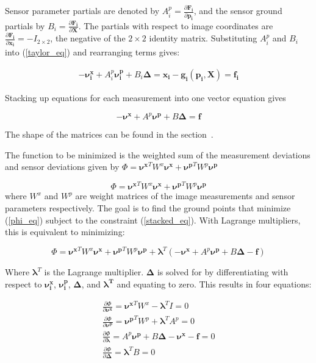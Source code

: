\documentclass[]{article}
\newcommand{\imgmeas}{\pmb{x_{i}}}
\newcommand{\grnd}{\pmb{X}}
\newcommand{\sensmeas}{\pmb{p_i}}
\newcommand{\imgnu}{\pmb{\nu_{i}^x}}
\newcommand{\sensnu}{\pmb{\nu_i^p}}
\newcommand{\grndupdate}{\pmb{\Delta}}
\newcommand{\Fimgpartials}{\frac{\partial{\pmb{F_{i}}}}{\partial{\imgmeas}}}
\newcommand{\Fgrndpartials}{\frac{\partial{\pmb{F_{i}}}}{\partial{\grnd}}}
\newcommand{\Fsenspartials}{\frac{\partial{\pmb{F_{i}}}}{\partial{\sensmeas}}}
\begin{document}
Sensor parameter partials are denoted by $A_{i}^p = \Fsenspartials$, and the sensor ground partials by $B_{i} = \Fgrndpartials$.  The partials with respect to image coordinates are ${\Fimgpartials=-I_{2 \times 2}}$, the negative of the $2 \times 2$ identity matrix.  Substituting $A_{i}^p$ and $B_{i}$ into (\ref{taylor_eq}) and rearranging terms gives:

\begin{equation} \label{linear_eq}
\begin{split}
-\imgnu + A_{i}^p\sensnu + B_{i}\grndupdate = \imgmeas - \pmb{g_i}(\sensmeas, \grnd) = \pmb{f_{i}}
\end{split}
\end{equation}

Stacking up equations for each measurement into one vector equation gives

\begin{equation}\label{stacked_eq}
-\pmb{\nu^x} + A^p\pmb{\nu^p} + B\grndupdate = \pmb{f}
\end{equation}

The shape of the matrices can be found in the section~.  


The function to be minimized is the weighted sum of the measurement deviations and sensor deviations given by $\Phi = \pmb{\nu^x}^T W^x \pmb{\nu^x} + \pmb{\nu^p}^T W^p \pmb{\nu^p}$

\begin{equation} \label{phi_eq}
\Phi = \pmb{\nu^x}^T W^x \pmb{\nu^x} + \pmb{\nu^p}^T W^p \pmb{\nu^p}
\end{equation}
where $W^x$ and $W^p$ are weight matrices of the image measurements and sensor parameters respectively.  The goal is to find the ground points that minimize (\ref{phi_eq}) subject to the constraint (\ref{stacked_eq}).  With Lagrange multipliers, this is equivalent to minimizing:

\begin{equation*}
\Phi = \pmb{\nu^x}^T W^x \pmb{\nu^x} + \pmb{\nu^p}^T W^p \pmb{\nu^p} + \pmb{\lambda}^T(-\pmb{\nu^x} + A^p\pmb{\nu^p} + B\pmb{\Delta} - \pmb{f})
\end{equation*} 

Where $\pmb{\lambda}^T$ is the Lagrange multiplier.  $\pmb{\Delta}$ is solved for by differentiating with respect to $\imgnu$, $\sensnu$, $\pmb{\Delta}$, and $\pmb{\lambda^T}$ and equating to zero.  This results in four equations:

\begin{equation} \label{partials_eq}
\begin{split}
\frac{\partial \Phi}{\partial \pmb{\nu^x}}=\pmb{\nu^x}^T W^x - \pmb{\lambda}^T I = 0 \\
\frac{\partial \Phi}{\partial \pmb{\nu^p}}=\pmb{\nu^p}^T W^p + \pmb{\lambda}^T A^p = 0 \\
\frac{\partial \Phi}{\partial \pmb{\lambda}} = A^p\pmb{\nu^p} + B\pmb{\Delta} - \pmb{\nu^x} - \pmb{f} = 0 \\
\frac{\partial \Phi}{\partial \pmb{\Delta}} = \pmb{\lambda}^TB = 0
\end{split}
\end{equation}
\end{document}
